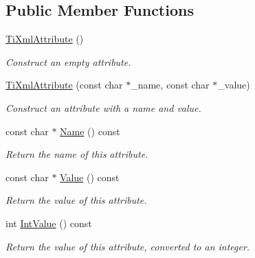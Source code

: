 \subsection*{Public Member Functions}
\begin{DoxyCompactItemize}
\item 
\mbox{\label{classTiXmlAttribute_a9cfa3c8179873fd485d83003b114f8e1}} 
\hyperlink{classTiXmlAttribute_a9cfa3c8179873fd485d83003b114f8e1}{Ti\+Xml\+Attribute} ()
\begin{DoxyCompactList}\small\item\em Construct an empty attribute. \end{DoxyCompactList}\item 
\mbox{\label{classTiXmlAttribute_a759d0b76fb8fcf765ecab243bc14f05e}} 
\hyperlink{classTiXmlAttribute_a759d0b76fb8fcf765ecab243bc14f05e}{Ti\+Xml\+Attribute} (const char $\ast$\+\_\+name, const char $\ast$\+\_\+value)
\begin{DoxyCompactList}\small\item\em Construct an attribute with a name and value. \end{DoxyCompactList}\item 
\mbox{\label{classTiXmlAttribute_a008ef948268ee752b58c60d63d84bb01}} 
const char $\ast$ \hyperlink{classTiXmlAttribute_a008ef948268ee752b58c60d63d84bb01}{Name} () const
\begin{DoxyCompactList}\small\item\em Return the name of this attribute. \end{DoxyCompactList}\item 
\mbox{\label{classTiXmlAttribute_ac9f0b56fcacbedb6eb49e5f282bef014}} 
const char $\ast$ \hyperlink{classTiXmlAttribute_ac9f0b56fcacbedb6eb49e5f282bef014}{Value} () const
\begin{DoxyCompactList}\small\item\em Return the value of this attribute. \end{DoxyCompactList}\item 
\mbox{\label{classTiXmlAttribute_ac8501370b065df31a35003c81d87cef2}} 
int \hyperlink{classTiXmlAttribute_ac8501370b065df31a35003c81d87cef2}{Int\+Value} () const
\begin{DoxyCompactList}\small\item\em Return the value of this attribute, converted to an integer. \end{DoxyCompactList}\item 

\end{DoxyCompactItemize}
